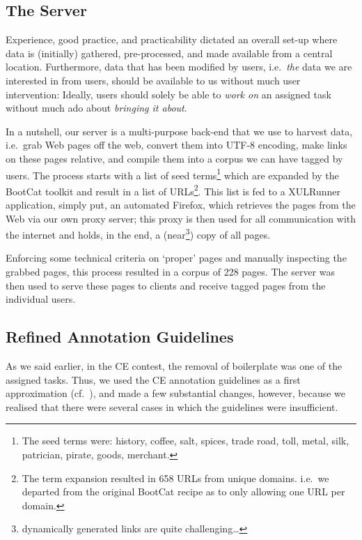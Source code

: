 \documentclass[12pt]{article}
\begin{document}
\subsection{The Server}
Experience, good practice, and practicability dictated an overall set-up where data is (initially) gathered, pre-processed, and made available from a central location. 
Furthermore, data that has been modified by users, i.e.~\textit{the} data we are interested in from users, should be available to us without much user intervention: 
Ideally, users should solely be able to \textit{work on} an assigned task without much ado about \textit{bringing it about}.  

In a nutshell, our server is a multi-purpose back-end that we use to harvest data, i.e.~grab Web pages off the web, convert them into UTF-8 encoding\cite{unicode.org}, make links on these pages relative\cite{w3.org/base}, and compile them into a corpus we can have tagged by users. 
The process starts with a list of seed terms\footnote{The seed terms were: history, coffee, salt, spices, trade road, toll, metal, silk, patrician, pirate, goods, merchant.} which are expanded by the BootCat toolkit\cite{BaroniSilvia2004} and result in a list of URLs\footnote{The term expansion resulted in 658 URLs from unique domains. i.e.~we departed from the original BootCat recipe as to only allowing one URL per domain.}. 
This list is fed to a XULRunner application\cite{xulrunner}, simply put, an automated Firefox\cite{firefox}, which retrieves the pages from the Web via our own proxy server\cite{wwwoffle}; this proxy is then used for all communication with the internet and holds, in the end, a (near\footnote{dynamically generated links are quite challenging\ldots}) copy of all pages. 

Enforcing some technical criteria on `proper' pages and manually inspecting the grabbed pages, this process resulted in a corpus of 228 pages. The server was then used to serve these pages to clients and receive tagged pages from the individual users.


\subsection{Refined Annotation Guidelines\footnotemark}

As we said earlier, in the CE contest, the removal of boilerplate was one of the assigned tasks. 
Thus, we used the CE annotation guidelines as a first approximation (cf.~\cite{cleaneval/annotation_guidelines}), and made a few substantial changes, however, because we realised that there were several cases in which the guidelines were insufficient.
\end{document}
